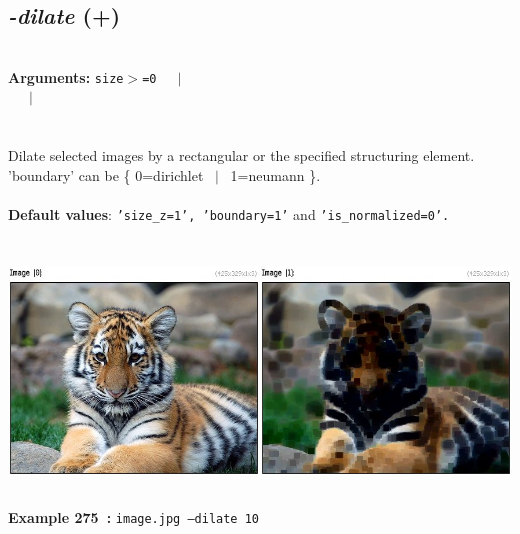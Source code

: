 \documentclass[a4paper,11pt,twoside]{book}
\begin{document}
\subsection{\emph{-dilate} (+)}\vspace*{-0.5em}
~\\\textbf{Arguments: } 
{\small \texttt{size$>$=0}}~~~$|$\\
~~~$|$\\
\\~\\
Dilate selected images by a rectangular or the specified structuring element.
~\\'boundary' can be \{ 0=dirichlet ~$|$~ 1=neumann \}.
~\\~\\\textbf{Default values}: {\small \texttt{'size\_z=1', 'boundary=1'} and \texttt{'is\_normalized=0'.}}
\begin{center}\includegraphics[keepaspectratio=true,height=7cm,width=\textwidth]{img/gmic_def275.jpg}\\
{\footnotesize \textbf{Example 275~:} \texttt{image.jpg --dilate 10}}
\end{center}
\end{document}
